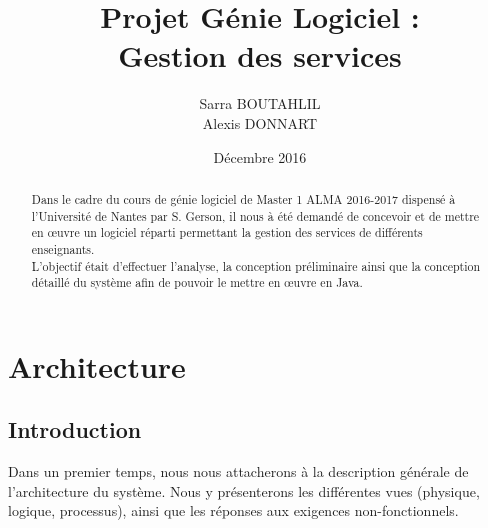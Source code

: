 \documentclass[a4paper,11pt]{article}
\newcommand{\br}{\\\mbox{}}
\begin{document}

\title{\color{red}Projet Génie Logiciel : \br\textbf{Gestion des services}}
\date{Décembre 2016}
\author{Sarra BOUTAHLIL\br Alexis DONNART}

\maketitle

\begin{abstract}
Dans le cadre du cours de génie logiciel de Master 1 ALMA 2016-2017 dispensé à l'Université de Nantes par S. Gerson, il nous à été demandé de concevoir et de mettre en œuvre un logiciel réparti permettant la gestion des services de différents enseignants.\br
L'objectif était d'effectuer l'analyse, la conception préliminaire ainsi que la conception détaillé du système afin de pouvoir le mettre en œuvre en Java.\br
\end{abstract}
\pagebreak

\tableofcontents


\pagebreak 
\section{Architecture}

\subsection{Introduction}

Dans un premier temps, nous nous attacherons à la description générale de l'architecture du système. Nous y présenterons les différentes vues (physique, logique, processus), ainsi que les réponses aux exigences non-fonctionnels.
\end{document}

